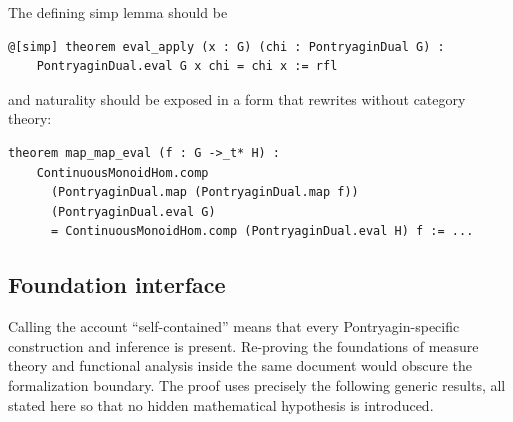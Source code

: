 \documentclass[11pt]{article}
\theoremstyle{definition}
\theoremstyle{remark}
\begin{document}
The defining simp lemma should be
\begin{lstlisting}
@[simp] theorem eval_apply (x : G) (chi : PontryaginDual G) :
    PontryaginDual.eval G x chi = chi x := rfl
\end{lstlisting}
and naturality should be exposed in a form that rewrites without category theory:
\begin{lstlisting}
theorem map_map_eval (f : G ->_t* H) :
    ContinuousMonoidHom.comp
      (PontryaginDual.map (PontryaginDual.map f))
      (PontryaginDual.eval G)
      = ContinuousMonoidHom.comp (PontryaginDual.eval H) f := ...
\end{lstlisting}

\subsection{Foundation interface}
\label{subsec:foundations}

Calling the account ``self-contained'' means that every Pontryagin-specific construction
and inference is present.  Re-proving the foundations of measure theory and functional
analysis inside the same document would obscure the formalization boundary.  The proof
uses precisely the following generic results, all stated here so that no hidden
mathematical hypothesis is introduced.
\end{document}
